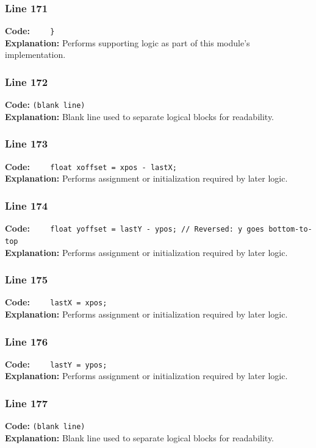 \documentclass[11pt,a4paper]{article}
\begin{document}
\subsubsection*{Line 171}
\textbf{Code:} \verb|    }|\\
\textbf{Explanation:} Performs supporting logic as part of this module's implementation.

\subsubsection*{Line 172}
\textbf{Code:} \texttt{(blank line)}\\
\textbf{Explanation:} Blank line used to separate logical blocks for readability.

\subsubsection*{Line 173}
\textbf{Code:} \verb|    float xoffset = xpos - lastX;|\\
\textbf{Explanation:} Performs assignment or initialization required by later logic.

\subsubsection*{Line 174}
\textbf{Code:} \verb|    float yoffset = lastY - ypos; // Reversed: y goes bottom-to-top|\\
\textbf{Explanation:} Performs assignment or initialization required by later logic.

\subsubsection*{Line 175}
\textbf{Code:} \verb|    lastX = xpos;|\\
\textbf{Explanation:} Performs assignment or initialization required by later logic.

\subsubsection*{Line 176}
\textbf{Code:} \verb|    lastY = ypos;|\\
\textbf{Explanation:} Performs assignment or initialization required by later logic.

\subsubsection*{Line 177}
\textbf{Code:} \texttt{(blank line)}\\
\textbf{Explanation:} Blank line used to separate logical blocks for readability.
\end{document}
